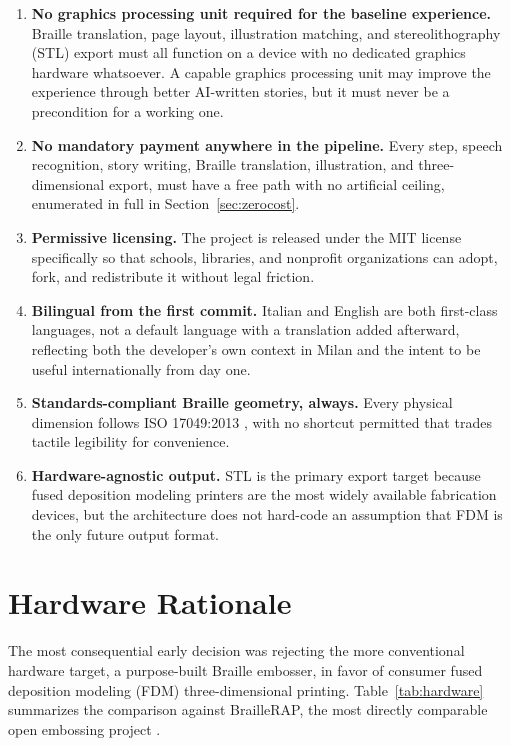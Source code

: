 \documentclass[conference]{IEEEtran}
\begin{document}
\begin{enumerate}
\item \textbf{No graphics processing unit required for the baseline experience.} Braille translation, page layout, illustration matching, and stereolithography (STL) export must all function on a device with no dedicated graphics hardware whatsoever. A capable graphics processing unit may improve the experience through better AI-written stories, but it must never be a precondition for a working one.
\item \textbf{No mandatory payment anywhere in the pipeline.} Every step, speech recognition, story writing, Braille translation, illustration, and three-dimensional export, must have a free path with no artificial ceiling, enumerated in full in Section~\ref{sec:zerocost}.
\item \textbf{Permissive licensing.} The project is released under the MIT license specifically so that schools, libraries, and nonprofit organizations can adopt, fork, and redistribute it without legal friction.
\item \textbf{Bilingual from the first commit.} Italian and English are both first-class languages, not a default language with a translation added afterward, reflecting both the developer's own context in Milan and the intent to be useful internationally from day one.
\item \textbf{Standards-compliant Braille geometry, always.} Every physical dimension follows ISO 17049:2013 \cite{iso17049}, with no shortcut permitted that trades tactile legibility for convenience.
\item \textbf{Hardware-agnostic output.} STL is the primary export target because fused deposition modeling printers are the most widely available fabrication devices, but the architecture does not hard-code an assumption that FDM is the only future output format.
\end{enumerate}

\section{Hardware Rationale}\label{sec:hardware}

The most consequential early decision was rejecting the more conventional hardware target, a purpose-built Braille embosser, in favor of consumer fused deposition modeling (FDM) three-dimensional printing. Table~\ref{tab:hardware} summarizes the comparison against BrailleRAP, the most directly comparable open embossing project \cite{braillerap}.
\end{document}
